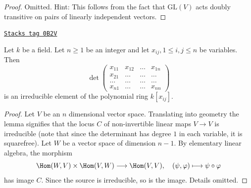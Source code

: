\begin{proof}
Omitted. Hint: This follows from the fact that $\text{GL}(V)$ acts doubly
transitive on pairs of linearly independent vectors.
\end{proof}

\begin{lemma}[Determinant]
\label{intersection-lemma-determinant}
\href{https://stacks.math.columbia.edu/tag/0B2V}{\texttt{Stacks tag 0B2V}}

Let $k$ be a field. Let $n \geq 1$ be an integer and let
$x_{ij}, 1 \leq i, j \leq n$ be variables. Then
$$
\det
\left(
\begin{matrix}
x_{11} & x_{12} & \ldots & x_{1n} \\
x_{21} & \ldots & \ldots & \ldots \\
\ldots & \ldots & \ldots & \ldots \\
x_{n1} & \ldots & \ldots & x_{nn}
\end{matrix}
\right)
$$
is an irreducible element of the polynomial ring $k[x_{ij}]$.
\end{lemma}

\begin{proof}
Let $V$ be an $n$ dimensional vector space. Translating into geometry
the lemma signifies that the locus $C$ of non-invertible linear maps
$V \to V$ is irreducible (note that since the determinant has degree
$1$ in each variable, it is squarefree). Let $W$ be a vector space of
dimension $n - 1$. By elementary linear algebra, the morphism
$$
\Hom(W, V) \times \Hom(V, W) \longrightarrow \Hom(V, V),\quad
(\psi, \varphi) \longmapsto \psi \circ \varphi
$$
has image $C$. Since the source is irreducible, so is the image.
Details omitted.
\end{proof}

